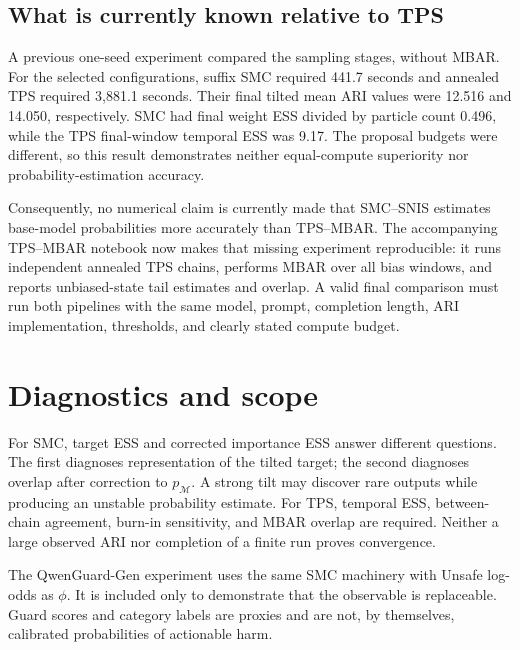 \documentclass[11pt,a4paper]{article}
\newcommand{\pM}{p_{\mathcal M}}
\newcommand{\1}{\mathbb I}
\begin{document}
\subsection{What is currently known relative to TPS}

A previous one-seed experiment compared the sampling stages, without MBAR.
For the selected configurations, suffix SMC required 441.7 seconds and
annealed TPS required 3,881.1 seconds. Their final tilted mean ARI values were
12.516 and 14.050, respectively. SMC had final weight ESS divided by particle
count 0.496, while the TPS final-window temporal ESS was 9.17. The proposal
budgets were different, so this result demonstrates neither equal-compute
superiority nor probability-estimation accuracy.

Consequently, no numerical claim is currently made that SMC--SNIS estimates
base-model probabilities more accurately than TPS--MBAR. The accompanying
TPS--MBAR notebook now makes that missing experiment reproducible: it runs
independent annealed TPS chains, performs MBAR over all bias windows, and
reports unbiased-state tail estimates and overlap. A valid final comparison
must run both pipelines with the same model, prompt, completion length, ARI
implementation, thresholds, and clearly stated compute budget.

\section{Diagnostics and scope}

For SMC, target ESS and corrected importance ESS answer different questions.
The first diagnoses representation of the tilted target; the second diagnoses
overlap after correction to $\pM$. A strong tilt may discover rare outputs
while producing an unstable probability estimate. For TPS, temporal ESS,
between-chain agreement, burn-in sensitivity, and MBAR overlap are required.
Neither a large observed ARI nor completion of a finite run proves convergence.

The QwenGuard-Gen experiment uses the same SMC machinery with Unsafe log-odds
as $\phi$. It is included only to demonstrate that the observable is
replaceable. Guard scores and category labels are proxies and are not, by
themselves, calibrated probabilities of actionable harm.
\end{document}
